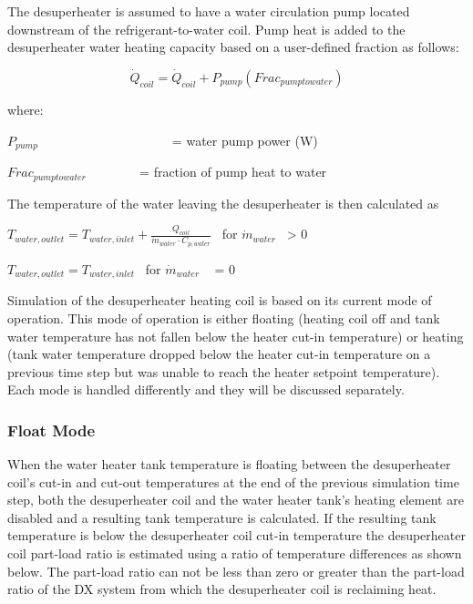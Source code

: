 The desuperheater is assumed to have a water circulation pump located downstream of the refrigerant-to-water coil. Pump heat is added to the desuperheater water heating capacity based on a user-defined fraction as follows:

\begin{equation}
{\dot Q_{coil}} = {\dot Q_{coil}} + {P_{pump}}\left( {Fra{c_{pumptowater}}} \right)
\end{equation}

where:

\({P_{pump}}\) ~~~~~~~~ ~~~~~~~~~~~ = water pump power (W)

\(Fra{c_{pumptowater}}\) ~~~~~~~ = fraction of pump heat to water

The temperature of the water leaving the desuperheater is then calculated as

\({T_{water,outlet}} = {T_{water,inlet}} + \frac{{{Q_{coil}}}}{{{{\dot m}_{water}}\cdot {C_{p,water}}}}\) ~for \({\dot m_{water}}\) ~\textgreater{} 0

\({T_{water,outlet}} = {T_{water,inlet}}\) ~for \({\dot m_{water}}\) ~ = 0

Simulation of the desuperheater heating coil is based on its current mode of operation. This mode of operation is either floating (heating coil off and tank water temperature has not fallen below the heater cut-in temperature) or heating (tank water temperature dropped below the heater cut-in temperature on a previous time step but was unable to reach the heater setpoint temperature). Each mode is handled differently and they will be discussed separately.

\subsubsection{Float Mode}\label{float-mode}

When the water heater tank temperature is floating between the desuperheater coil's cut-in and cut-out temperatures at the end of the previous simulation time step, both the desuperheater coil and the water heater tank's heating element are disabled and a resulting tank temperature is calculated. If the resulting tank temperature is below the desuperheater coil cut-in temperature the desuperheater coil part-load ratio is estimated using a ratio of temperature differences as shown below. The part-load ratio can not be less than zero or greater than the part-load ratio of the DX system from which the desuperheater coil is reclaiming heat.

